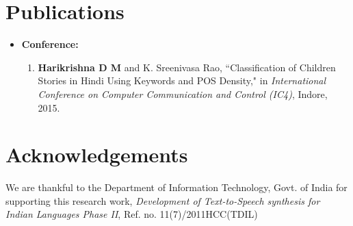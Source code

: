 \documentclass[times, 11pt, a4paper]{article}
\begin{document}
\section*{Publications} 
\begin{itemize}
		\item[] { \bf {Conference:}}
	\begin{enumerate}
	 	\item \textbf{Harikrishna D M} and K. Sreenivasa Rao, ``Classification of Children Stories in Hindi Using Keywords and POS Density," in \textit{International Conference on Computer Communication and Control (IC4)}, Indore, 2015.
	 	\end{enumerate}
	 	\end{itemize}
	 


\section*{Acknowledgements}
We are thankful to the Department of Information Technology, Govt. of India for supporting this research work, \textit{Development of Text-to-Speech synthesis for Indian Languages Phase II}, Ref. no. 11(7)/2011HCC(TDIL)




\end{document}
